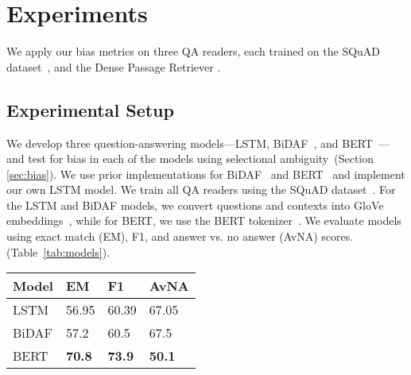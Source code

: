 \section{Experiments}
We apply our bias metrics on three QA readers, each trained on the SQuAD dataset~\cite{rajpurkar2016squad}, and the Dense Passage Retriever \cite{karpukhin2020dense}. 
\subsection{Experimental Setup}
We develop three question-answering models---LSTM, BiDAF~\cite{seo2016bidirectional}, and BERT~\cite{devlin2018bert}---and test for bias in each of the models using selectional ambiguity~(Section \ref{sec:bias}). 
We use prior implementations for BiDAF~\cite{chrischute} and BERT~\cite{wolf2019huggingface} and implement our own LSTM model. 
We train all QA readers using the SQuAD dataset~\cite{rajpurkar2016squad}.
For the LSTM and BiDAF models, we convert questions and contexts into GloVe embeddings~\cite{pennington2014glove}, while for BERT, we use the BERT tokenizer~\cite{wolf2019huggingface}. 
We evaluate models using exact match (EM), F1, and answer vs. no answer (AvNA) scores.  
(Table~\ref{tab:models}). 


\begin{table*}[]
	\begin{center}
		\begin{tabular}{llll}
			
			Model                    & EM    & F1    & AvNA  \\ \hline
			LSTM 					 & 56.95 & 60.39 & 67.05 \\ 
			BiDAF                    & 57.2  & 60.5  & 67.5  \\ 
			BERT		             & \textbf{70.8}  & \textbf{73.9}  & \textbf{50.1}  \\ \hline
		\end{tabular}
		\caption{\label{tab:models} Accuracy metrics on the SQuAD 2.0 dev set. Despite outperforming the other two models on all accuracy metrics and answering more frequently, BERT scores similarly in bias metrics}
	\end{center}
	
\end{table*}

